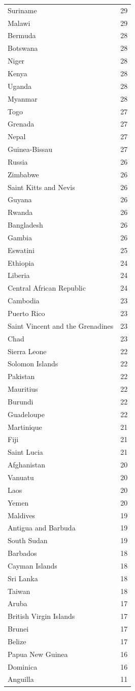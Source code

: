 \begin{tabular}{ll}
Suriname & 29 \\
Malawi & 29 \\
Bermuda & 28 \\
Botswana & 28 \\
Niger & 28 \\
Kenya & 28 \\
Uganda & 28 \\
Myanmar & 28 \\
Togo & 27 \\
Grenada & 27 \\
Nepal & 27 \\
Guinea-Bissau & 27 \\
Russia & 26 \\
Zimbabwe & 26 \\
Saint Kitts and Nevis & 26 \\
Guyana & 26 \\
Rwanda & 26 \\
Bangladesh & 26 \\
Gambia & 26 \\
Eswatini & 25 \\
Ethiopia & 24 \\
Liberia & 24 \\
Central African Republic & 24 \\
Cambodia & 23 \\
Puerto Rico & 23 \\
Saint Vincent and the Grenadines & 23 \\
Chad & 23 \\
Sierra Leone & 22 \\
Solomon Islands & 22 \\
Pakistan & 22 \\
Mauritius & 22 \\
Burundi & 22 \\
Guadeloupe & 22 \\
Martinique & 21 \\
Fiji & 21 \\
Saint Lucia & 21 \\
Afghanistan & 20 \\
Vanuatu & 20 \\
Laos & 20 \\
Yemen & 20 \\
Maldives & 19 \\
Antigua and Barbuda & 19 \\
South Sudan & 19 \\
Barbados & 18 \\
Cayman Islands & 18 \\
Sri Lanka & 18 \\
Taiwan & 18 \\
Aruba & 17 \\
British Virgin Islands & 17 \\
Brunei & 17 \\
Belize & 17 \\
Papua New Guinea & 16 \\
Dominica & 16 \\
Anguilla & 11 \\
\bottomrule
\end{tabular}
